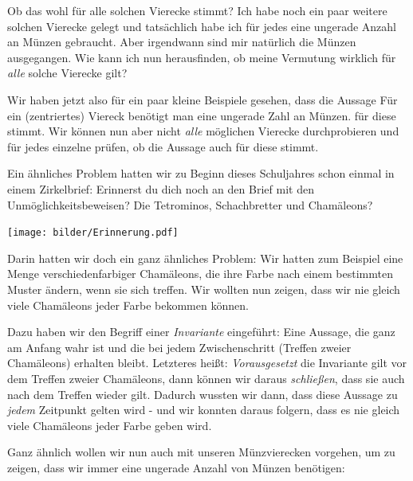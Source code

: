 \documentclass[a4paper,ngerman,12pt]{scrartcl}
\theoremstyle{definition}
\theoremstyle{plain}
\theoremstyle{remark}
\begin{document}
Ob das wohl für alle solchen Vierecke stimmt? Ich habe noch ein paar weitere solchen Vierecke gelegt und tatsächlich habe ich für jedes eine ungerade Anzahl an Münzen gebraucht. Aber irgendwann sind mir natürlich die Münzen ausgegangen. Wie kann ich nun herausfinden, ob meine Vermutung wirklich für \emph{alle} solche Vierecke gilt?

Wir haben jetzt also für ein paar kleine Beispiele gesehen, dass die Aussage \glqq Für ein (zentriertes) Viereck benötigt man eine ungerade Zahl an Münzen.\grqq{} für diese stimmt. Wir können nun aber nicht \emph{alle} möglichen Vierecke durchprobieren und für jedes einzelne prüfen, ob die Aussage auch für diese stimmt.

Ein ähnliches Problem hatten wir zu Beginn dieses Schuljahres schon einmal in einem Zirkelbrief: Erinnerst du dich noch an den Brief mit den Unmöglichkeitsbeweisen? Die Tetrominos, Schachbretter und Chamäleons? 

\begin{center}
	\texttt{[image: bilder/Erinnerung.pdf]}
\end{center}

Darin hatten wir doch ein ganz ähnliches Problem: Wir hatten zum Beispiel eine Menge verschiedenfarbiger Chamäleons, die ihre Farbe nach einem bestimmten Muster ändern, wenn sie sich treffen. Wir wollten nun zeigen, dass wir nie gleich viele Chamäleons jeder Farbe bekommen können.

Dazu haben wir den Begriff einer \emph{Invariante} eingeführt: Eine Aussage, die ganz am Anfang wahr ist und die bei jedem Zwischenschritt (Treffen zweier Chamäleons) erhalten bleibt. Letzteres heißt: \emph{Vorausgesetzt} die Invariante gilt vor dem Treffen zweier Chamäleons, dann können wir daraus \emph{schließen}, dass sie auch nach dem Treffen wieder gilt. Dadurch wussten wir dann, dass diese Aussage zu \emph{jedem} Zeitpunkt gelten wird - und wir konnten daraus folgern, dass es nie gleich viele Chamäleons jeder Farbe geben wird.

Ganz ähnlich wollen wir nun auch mit unseren Münzvierecken vorgehen, um zu zeigen, dass wir immer eine ungerade Anzahl von Münzen benötigen:
\end{document}
